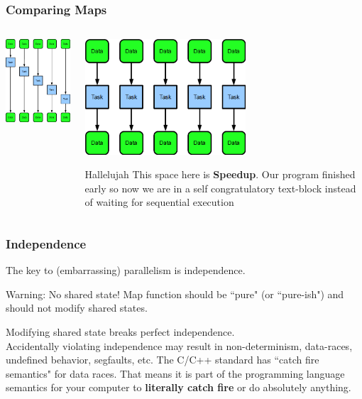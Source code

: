 \documentclass[xcolor=dvipsnames]{beamer}
\begin{document}
		\begin{frame}[fragile] \frametitle{Comparing Maps}
		\begin{columns}
			\begin{column}{0.5\textwidth}
			\includegraphics[width=60mm]{images/map_serial.png}
		     \end{column}
  			\begin{column}{0.5\textwidth}
			\includegraphics[width=60mm]{images/map_parallel.png}\pause
			\begin{block}{Hallelujah}
			This space here is \textbf{Speedup}.  Our program finished early so now we are in a self congratulatory text-block instead of waiting for sequential execution
			\end{block}
		     \end{column}
		\end{columns}
		\end{frame}
		
		\begin{frame} \frametitle{Independence}
		The key to (embarrassing) parallelism is independence.  \pause
		\begin{alertblock}{Warning: No shared state!}
		Map function should be ``pure" (or ``pure-ish") and should not modify shared states.
		\end{alertblock}
		Modifying shared state breaks perfect independence.\\
		Accidentally violating independence may result in non-determinism, data-races, undefined behavior, segfaults, etc. \pause The C/C++ standard has ``catch fire semantics" for data races.  That means it is part of the programming language semantics for your computer to \textbf{literally catch fire} or do absolutely anything.
		\end{frame}
		
\end{document}
